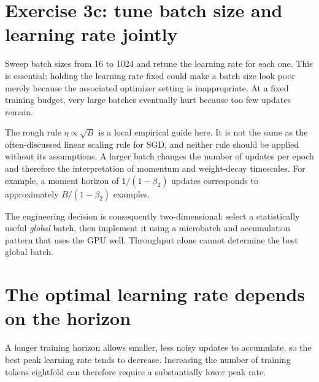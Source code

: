 

\section{Exercise 3c: tune batch size and learning rate jointly}
Sweep batch sizes from 16 to 1024 and retune the learning rate for each one. This is essential: holding the learning rate fixed could make a batch size look poor merely because the associated optimizer setting is inappropriate. At a fixed training budget, very large batches eventually hurt because too few updates remain.


The rough rule $\eta\propto\sqrt{B}$ is a local empirical guide here. It is not the same as the often-discussed linear scaling rule for SGD, and neither rule should be applied without its assumptions. A larger batch changes the number of updates per epoch and therefore the interpretation of momentum and weight-decay timescales. For example, a moment horizon of $1/(1-\beta_2)$ updates corresponds to approximately $B/(1-\beta_2)$ examples.

The engineering decision is consequently two-dimensional: select a statistically useful \emph{global} batch, then implement it using a microbatch and accumulation pattern that uses the GPU well. Throughput alone cannot determine the best global batch.

\section{The optimal learning rate depends on the horizon}
A longer training horizon allows smaller, less noisy updates to accumulate, so the best peak learning rate tends to decrease. Increasing the number of training tokens eightfold can therefore require a substantially lower peak rate.

